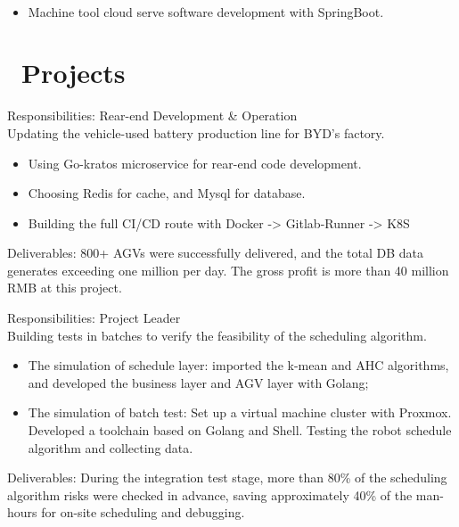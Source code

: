 \documentclass[a4paper,10pt]{resume}
\begin{document}
\\
\begin{itemize}[parsep=0.5ex]
  \item Machine tool cloud serve software development with SpringBoot.
\end{itemize}

\section{\faFile\ Projects}
Responsibilities: Rear-end Development \& Operation
\\Updating the vehicle-used battery production line for BYD's factory.
\begin{itemize}[parsep=0.5ex]
  \item Using Go-kratos microservice for rear-end code development.
  \item Choosing Redis for cache, and Mysql for database.
  \item Building the full CI/CD route with Docker -> Gitlab-Runner -> K8S
\end{itemize}
Deliverables: 800+ AGVs were successfully delivered, and the total DB data generates exceeding one million per day. The gross profit is more than 40 million RMB at this project.


Responsibilities: Project Leader
\\Building tests in batches to verify the feasibility of the scheduling algorithm.
\begin{itemize}[parsep=0.5ex]
  \item The simulation of schedule layer: imported the k-mean and AHC algorithms, and developed the business layer and AGV layer with Golang;
  \item The simulation of batch test: Set up a virtual machine cluster with Proxmox. Developed a toolchain based on Golang and Shell. Testing the robot schedule algorithm and collecting data.
\end{itemize}
Deliverables: During the integration test stage, more than 80\% of the scheduling algorithm risks were checked in advance, saving approximately 40\% of the man-hours for on-site scheduling and debugging.
\end{document}
